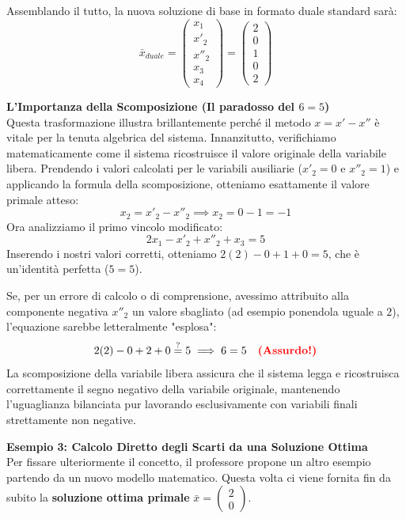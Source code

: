 \documentclass[12pt, a4paper]{article}
\begin{document}
	Assemblando il tutto, la nuova soluzione di base in formato duale standard sarà:
	\[
	\bar{x}_{duale} = \begin{pmatrix} x_1 \\ x'_2 \\ x''_2 \\ x_3 \\ x_4 \end{pmatrix} = \begin{pmatrix} 2 \\ 0 \\ 1 \\ 0 \\ 2 \end{pmatrix}
	\]
	
	\vspace{0.4cm}
	\textbf{L'Importanza della Scomposizione (Il paradosso del $6=5$)}\\
	Questa trasformazione illustra brillantemente perché il metodo $x = x' - x''$ è vitale per la tenuta algebrica del sistema. Innanzitutto, verifichiamo matematicamente come il sistema ricostruisce il valore originale della variabile libera. Prendendo i valori calcolati per le variabili ausiliarie ($x'_2 = 0$ e $x''_2 = 1$) e applicando la formula della scomposizione, otteniamo esattamente il valore primale atteso:
	\[
	x_2 = x'_2 - x''_2 \implies x_2 = 0 - 1 = -1
	\]
	Ora analizziamo il primo vincolo modificato:
	\[
	2x_1 - x'_2 + x''_2 + x_3 = 5
	\]
	Inserendo i nostri valori corretti, otteniamo $2(2) - 0 + 1 + 0 = 5$, che è un'identità perfetta ($5=5$).
	
	Se, per un errore di calcolo o di comprensione, avessimo attribuito alla componente negativa $x''_2$ un valore sbagliato (ad esempio ponendola uguale a $2$), l'equazione sarebbe letteralmente "esplosa":
	\[
	2(2) - 0 + 2 + 0 \stackrel{?}{=} 5 \implies 6 = 5 \quad \text{\textcolor{red}{\textbf{(Assurdo!)}}}
	\]
	La scomposizione della variabile libera assicura che il sistema legga e ricostruisca correttamente il segno negativo della variabile originale, mantenendo l'uguaglianza bilanciata pur lavorando esclusivamente con variabili finali strettamente non negative.
	
	\vspace{0.6cm}
	\textbf{Esempio 3: Calcolo Diretto degli Scarti da una Soluzione Ottima}\\
	Per fissare ulteriormente il concetto, il professore propone un altro esempio partendo da un nuovo modello matematico. Questa volta ci viene fornita fin da subito la \textbf{soluzione ottima primale} $\bar{x} = \begin{pmatrix} 2 \\ 0 \end{pmatrix}$.
	
\end{document}
